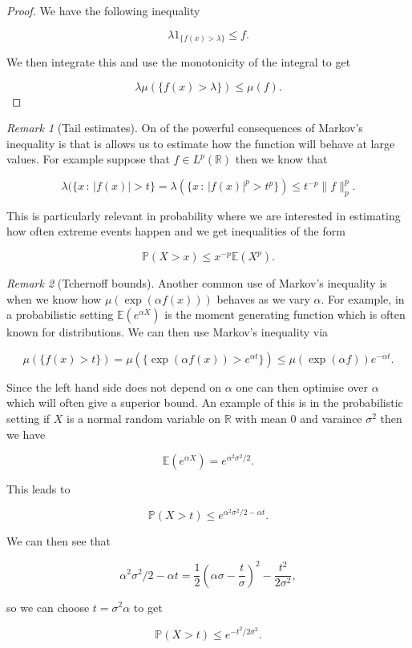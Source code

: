 \documentclass[
]{book}
\theoremstyle{definition}
\theoremstyle{definition}
\theoremstyle{definition}
\theoremstyle{definition}
\theoremstyle{remark}
\newtheorem*{remark}{Remark}
\begin{document}
\begin{proof}
We have the following inequality

\[ \lambda 1_{\{ f(x) > \lambda\}} \leq f. \]

We then integrate this and use the monotonicity of the integral to get

\[ \lambda \mu(\{ f(x) > \lambda\}) \leq \mu(f). \]
\end{proof}

\begin{remark}[Tail estimates]
On of the powerful consequences of Markov's inequality is that is allows us to estimate how the function will behave at large values. For example suppose that \(f \in L^p(\mathbb{R})\) then we know that

\[ \lambda(\{ x\, :\, |f(x)| > t \} = \lambda (\{ x\,:\, |f(x)|^p > t^p\}) \leq t^{-p} \|f\|_p^p.\]

This is particularly relevant in probability where we are interested in estimating how often extreme events happen and we get inequalities of the form

\[ \mathbb{P}(X > x) \leq x^{-p}\mathbb{E}(X^p). \]
\end{remark}

\begin{remark}[Tchernoff bounds]
Another common use of Markov's inequality is when we know how \(\mu( \exp( \alpha f(x)))\) behaves as we vary \(\alpha\). For example, in a probabilistic setting \(\mathbb{E}(e^{\alpha X})\) is the moment generating function which is often known for distributions. We can then use Markov's inequality via

\[ \mu(\{f(x)> t\}) = \mu( \{ \exp(\alpha f(x)) > e^{\alpha t} \} ) \leq \mu(\exp(\alpha f)) e^{-\alpha t}. \]

Since the left hand side does not depend on \(\alpha\) one can then optimise over \(\alpha\) which will often give a superior bound. An example of this is in the probabilistic setting if \(X\) is a normal random variable on \(\mathbb{R}\) with mean 0 and varaince \(\sigma^2\) then we have

\[ \mathbb{E}\left( e^{\alpha X}\right) = e^{\alpha^2 \sigma^2/2}. \]

This leads to

\[ \mathbb{P}(X> t) \leq e^{\alpha^2 \sigma^2/2-\alpha t}. \]

We can then see that

\[ \alpha^2 \sigma^2/2 - \alpha t = \frac{1}{2}\left(\alpha \sigma - \frac{t}{ \sigma} \right)^2 - \frac{t^2}{2 \sigma^2}, \]

so we can choose \(t= \sigma^2 \alpha\) to get

\[ \mathbb{P}(X > t) \leq e^{-t^2/2\sigma^2}.  \]
\end{remark}
\end{document}
